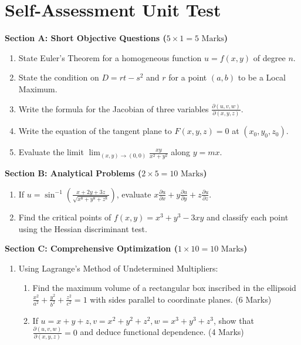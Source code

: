 \section{Self-Assessment Unit Test}

\begin{chaptertest}
\noindent\textbf{Section A: Short Objective Questions ($5 \times 1 = 5\text{ Marks}$)}
\begin{enumerate}[leftmargin=1.5em]
    \item State Euler's Theorem for a homogeneous function $u = f(x,y)$ of degree $n$.
    \item State the condition on $D = rt - s^2$ and $r$ for a point $(a,b)$ to be a Local Maximum.
    \item Write the formula for the Jacobian of three variables $\frac{\partial(u,v,w)}{\partial(x,y,z)}$.
    \item Write the equation of the tangent plane to $F(x,y,z) = 0$ at $(x_0,y_0,z_0)$.
    \item Evaluate the limit $\lim_{(x,y)\to(0,0)} \frac{xy}{x^2+y^2}$ along $y = mx$.
\end{enumerate}

\medskip
\noindent\textbf{Section B: Analytical Problems ($2 \times 5 = 10\text{ Marks}$)}
\begin{enumerate}[leftmargin=1.5em, start=6]
    \item If $u = \sin^{-1}\left(\frac{x+2y+3z}{\sqrt{x^8+y^8+z^8}}\right)$, evaluate $x \frac{\partial u}{\partial x} + y \frac{\partial u}{\partial y} + z \frac{\partial u}{\partial z}$.
    \item Find the critical points of $f(x,y) = x^3 + y^3 - 3xy$ and classify each point using the Hessian discriminant test.
\end{enumerate}

\medskip
\noindent\textbf{Section C: Comprehensive Optimization ($1 \times 10 = 10\text{ Marks}$)}
\begin{enumerate}[leftmargin=1.5em, start=8]
    \item Using Lagrange's Method of Undetermined Multipliers:
    \begin{enumerate}[label=(\alph*)]
        \item Find the maximum volume of a rectangular box inscribed in the ellipsoid $\frac{x^2}{a^2} + \frac{y^2}{b^2} + \frac{z^2}{c^2} = 1$ with sides parallel to coordinate planes. (6 Marks)
        \item If $u = x+y+z, v = x^2+y^2+z^2, w = x^3+y^3+z^3$, show that $\frac{\partial(u,v,w)}{\partial(x,y,z)} = 0$ and deduce functional dependence. (4 Marks)
    \end{enumerate}
\end{enumerate}
\end{chaptertest}

